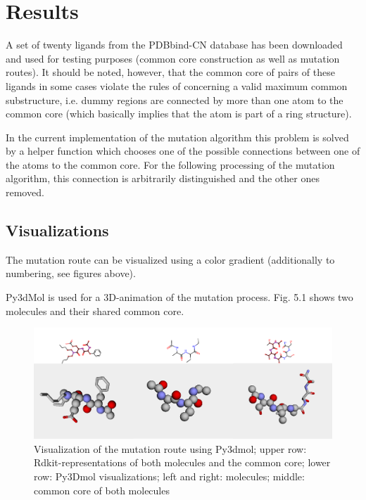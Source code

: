 \chapter{Results}

A set of twenty ligands from the PDBbind-CN database has been downloaded and used for testing
purposes (common core construction as well as mutation routes). It
should be noted, however, that the common core of pairs of these ligands
in some cases violate the rules of {\trafo} concerning a valid
maximum common substructure, i.e. dummy regions are connected by more
than one atom to the common core (which basically implies that the
atom is part of a ring structure). 

In the current implementation of the mutation algorithm this problem
is solved by a helper function which chooses one of the possible connections
between one of the atoms to the common core. For the following processing
of the mutation algorithm, this connection is arbitrarily distinguished
and the other ones removed. 


\section{Visualizations}

The mutation route can be visualized using a color gradient (additionally
to numbering, see figures above).

Py3dMol is used for a 3D-animation of the mutation process. Fig. 5.1
shows two molecules and their shared common core.

\begin{figure}
\includegraphics[scale=0.35]{trafo_py3d_1verkleinert}

\caption{Visualization of the mutation route using Py3dmol; upper row: Rdkit-representations
of both molecules and the common core; lower row: Py3Dmol visualizations;
left and right: molecules; middle: common core of both molecules}

\end{figure}


